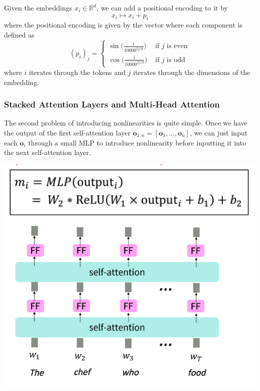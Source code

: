 \documentclass{article}
\begin{document}
      \begin{definition}
        Given the embeddings $x_i \in \mathbb{R}^{d}$, we can add a positional encoding to it by 
        \[x_i \mapsto x_i + p_i\]
        where the positional encoding is given by the vector where each component is defined as 
        \begin{equation} 
          (p_i)_j =  \begin{cases} 
              \sin \big( \frac{i}{10000^{2j/d}} \big) & \text{ if } j \text{ is even} \\ 
              \cos \big( \frac{i}{10000^{2j/d}} \big) & \text{ if } j \text{ is odd}
          \end{cases}
        \end{equation}
        where $i$ iterates through the tokens and $j$ iterates through the dimensions of the embedding. 
      \end{definition}

    \subsubsection{Stacked Attention Layers and Multi-Head Attention}

      The second problem of introducing nonlinearities is quite simple. Once we have the output of the first self-attention layer $\mathbf{o}_{1:n} = [\mathbf{o}_1, \ldots, \mathbf{o}_n]$, we can just input each $\mathbf{o}_i$ through a small MLP to introduce nonlinearity before inputting it into the next self-attention layer. 

      \begin{center}
        \includegraphics[scale=0.4]{img/stacked_self_attention_layers.png}
      \end{center}
\end{document}

